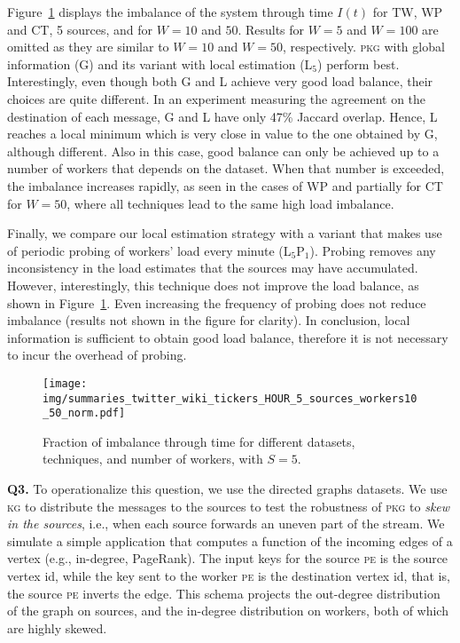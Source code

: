 \documentclass[10pt,conference,letterpaper]{IEEEtran}
\newcommand{\spara}[1]{\smallskip\noindent\textbf{#1}}
\newcommand{\pe}{\textsc{pe}\xspace}
\newcommand{\pkgs}{\textsc{pkg}\xspace}
\newcommand{\kg}{\textsc{kg}\xspace}
\begin{document}
Figure~\ref{fig:avg-time} displays the imbalance of the system through time $I(t)$ for TW, WP and CT, 5 sources, and for $W=10$ and $50$.
Results for $W=5$ and $W=100$ are omitted as they are similar to $W=10$ and $W=50$, respectively.
\pkgs with global information (G) and its variant with local estimation (L$_5$) perform best.
Interestingly, even though both G and L achieve very good load balance, their choices are quite different.
In an experiment measuring the agreement on the destination of each message, G and L have only 47\% Jaccard overlap.
Hence, L reaches a local minimum which is very close in value to the one obtained by G, although different.
Also in this case, good balance can only be achieved up to a number of workers that depends on the dataset.
When that number is exceeded, the imbalance increases rapidly, as seen in the cases of WP and partially for CT for $W=50$, where all techniques lead to the same high load imbalance.

Finally, we compare our local estimation strategy with a variant that makes use of periodic probing of workers' load every minute (L$_5$P$_1$).
Probing removes any inconsistency in the load estimates that the sources may have accumulated.
However, interestingly, this technique does not improve the load balance, as shown in Figure~\ref{fig:avg-time}.
Even increasing the frequency of probing does not reduce imbalance (results not shown in the figure for clarity).
In conclusion, local information is sufficient to obtain good load balance, therefore it is not necessary to incur the overhead of probing.


\begin{figure}[t]
\begin{center}
	\texttt{[image: img/summaries\_twitter\_wiki\_tickers\_HOUR\_5\_sources\_workers10\_50\_norm.pdf]}
	\caption{Fraction of imbalance through time for different datasets, techniques, and number of workers, with $S=5$.}
	\label{fig:avg-time}
\hspace{-4mm}
\end{center}
\end{figure}










\enlargethispage{\baselineskip}

\spara{Q3.}
To operationalize this question, we use the directed graphs datasets.
We use \kg to distribute the messages to the sources to test the robustness of \pkgs to \emph{skew in the sources}, i.e., when each source forwards an uneven part of the stream.
We simulate a simple application that computes a function of the incoming edges of a vertex (e.g., in-degree, PageRank).
The input keys for the source \pe is the source vertex id, while the key sent to the worker \pe is the destination vertex id, that is, the source \pe inverts the edge.
This schema projects the out-degree distribution of the graph on sources, and the in-degree distribution on workers, both of which are highly skewed.
\end{document}
